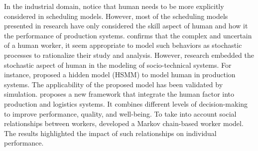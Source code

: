 \documentclass[review,12pt, 3p, times]{elsarticle}
\begin{document}
In the industrial domain, \citep{Bogataj2018,Onay2023,Bentefouet2012} notice that  human  needs to be more explicitly considered in scheduling models. However, most of the scheduling models presented in research have only considered the skill aspect of human  and  how it  the performance of production systems. 
\cite{lucchese2023stochastic} confirms that  the complex and uncertain  of a human worker, it seem appropriate to model such behaviors as stochastic processes to rationalize their study and analysis. However,  research  embedded the stochastic aspect of human  in the modeling of socio-technical systems. For instance,  \citep{lin2022human} proposed a hidden  model (HSMM) to model human  in production systems. The applicability of the proposed model has been validated by simulation.
\citep{vijayakumar2022framework} proposes a new framework that integrate the human factor into production and logistics systems. It combines different levels of decision-making to improve performance, quality, and well-being.
To take into account social relationships between workers, \citep{elkosantini2009integration} developed a Markov chain-based worker  model. The results highlighted the impact of such relationships on individual performance.
\end{document}
